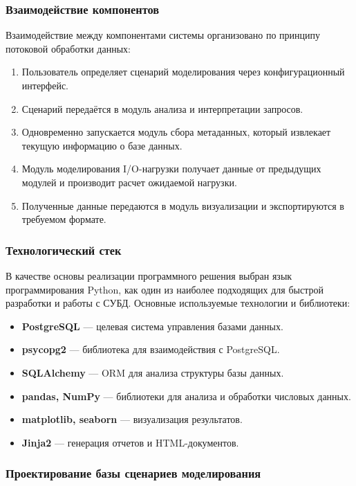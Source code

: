 \subsubsection{Взаимодействие компонентов}

Взаимодействие между компонентами системы организовано по принципу потоковой обработки данных:

\begin{enumerate}
\item Пользователь определяет сценарий моделирования через конфигурационный интерфейс.
\item Сценарий передаётся в модуль анализа и интерпретации запросов.
\item Одновременно запускается модуль сбора метаданных, который извлекает текущую информацию о базе данных.
\item Модуль моделирования I/O-нагрузки получает данные от предыдущих модулей и производит расчет ожидаемой нагрузки.
\item Полученные данные передаются в модуль визуализации и экспортируются в требуемом формате.
\end{enumerate}

\subsubsection{Технологический стек}

В качестве основы реализации программного решения выбран язык программирования Python, как один из наиболее подходящих для быстрой разработки и работы с СУБД. Основные используемые технологии и библиотеки:

\begin{itemize}
\item \textbf{PostgreSQL} --- целевая система управления базами данных.
\item \textbf{psycopg2} --- библиотека для взаимодействия с PostgreSQL.
\item \textbf{SQLAlchemy} --- ORM для анализа структуры базы данных.
\item \textbf{pandas, NumPy} --- библиотеки для анализа и обработки числовых данных.
\item \textbf{matplotlib, seaborn} --- визуализация результатов.
\item \textbf{Jinja2} --- генерация отчетов и HTML-документов.
\end{itemize}

\subsubsection{Проектирование базы сценариев моделирования}

